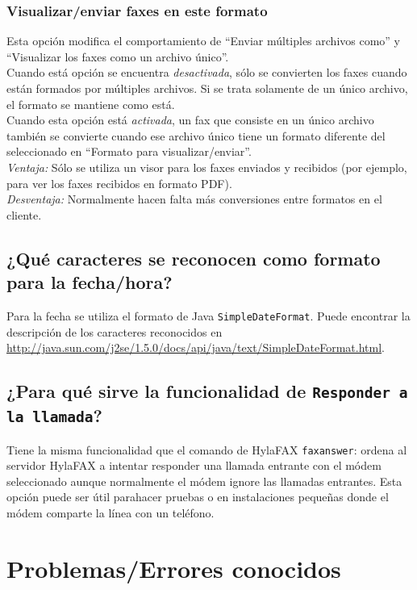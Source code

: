 \documentclass[a4paper,10pt]{scrartcl}
\begin{document}
\subsubsection{Visualizar/enviar faxes en este formato}
Esta opción modifica el comportamiento de ``Enviar múltiples archivos como'' y ``Visualizar los faxes como un archivo único''.\\
Cuando está opción se encuentra \textit{desactivada}, sólo se convierten los faxes cuando están formados por múltiples archivos. Si se trata solamente de un único archivo, el formato se mantiene como está.\\
Cuando esta opción está \textit{activada}, un fax que consiste en un único archivo también se convierte cuando ese archivo único tiene un formato diferente del seleccionado en ``Formato para visualizar/enviar''.\\
\textit{Ventaja:} Sólo se utiliza un visor para los faxes enviados y recibidos (por ejemplo, para ver los faxes recibidos en formato PDF).\\
\textit{Desventaja:} Normalmente hacen falta más conversiones entre formatos en el cliente.

\subsection{¿Qué caracteres se reconocen como formato para la fecha/hora?}

Para la fecha se utiliza el formato de Java \texttt{SimpleDateFormat}. Puede encontrar la descripción de los caracteres reconocidos en \url{http://java.sun.com/j2se/1.5.0/docs/api/java/text/SimpleDateFormat.html}.

\subsection{¿Para qué sirve la funcionalidad de \texttt{Responder a la llamada}?}

Tiene la misma funcionalidad que el comando de HylaFAX \verb#faxanswer#: ordena al servidor HylaFAX a intentar responder una llamada entrante con el módem seleccionado aunque normalmente el módem ignore las llamadas entrantes. Esta opción puede ser útil parahacer pruebas o en instalaciones pequeñas donde el módem comparte la línea con un teléfono.

\section{Problemas/Errores conocidos}
\end{document}
